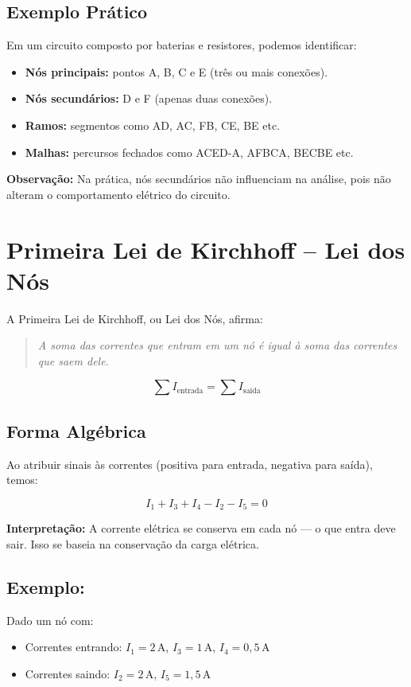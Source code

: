 \subsection{Exemplo Prático}
Em um circuito composto por baterias e resistores, podemos identificar:
\begin{itemize}
    \item \textbf{Nós principais:} pontos A, B, C e E (três ou mais conexões).
    \item \textbf{Nós secundários:} D e F (apenas duas conexões).
    \item \textbf{Ramos:} segmentos como AD, AC, FB, CE, BE etc.
    \item \textbf{Malhas:} percursos fechados como ACED-A, AFBCA, BECBE etc.
\end{itemize}

\textbf{Observação:} Na prática, nós secundários não influenciam na análise, pois não alteram o comportamento elétrico do circuito.

\section{Primeira Lei de Kirchhoff – Lei dos Nós}
A Primeira Lei de Kirchhoff, ou Lei dos Nós, afirma:

\begin{quote}
\textit{A soma das correntes que entram em um nó é igual à soma das correntes que saem dele.}
\end{quote}

\[
\sum I_{\text{entrada}} = \sum I_{\text{saída}}
\]

\subsection{Forma Algébrica}
Ao atribuir sinais às correntes (positiva para entrada, negativa para saída), temos:

\[
I_1 + I_3 + I_4 - I_2 - I_5 = 0
\]

\textbf{Interpretação:} A corrente elétrica se conserva em cada nó — o que entra deve sair. Isso se baseia na conservação da carga elétrica.

\subsection{Exemplo:}
Dado um nó com:
\begin{itemize}
    \item Correntes entrando: $I_1 = 2\,\text{A}$, $I_3 = 1\,\text{A}$, $I_4 = 0{,}5\,\text{A}$
    \item Correntes saindo: $I_2 = 2\,\text{A}$, $I_5 = 1{,}5\,\text{A}$
\end{itemize}

